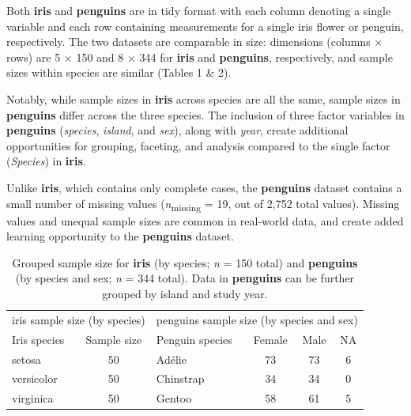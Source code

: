 Both \textbf{iris} and \textbf{penguins} are in tidy format
\citep{wickham_tidy_2014} with each column denoting a single variable
and each row containing measurements for a single iris flower or
penguin, respectively. The two datasets are comparable in size:
dimensions (columns × rows) are 5 × 150 and 8 × 344 for \textbf{iris}
and \textbf{penguins}, respectively, and sample sizes within species are
similar (Tables 1 \& 2).

Notably, while sample sizes in \textbf{iris} across species are all the
same, sample sizes in \textbf{penguins} differ across the three species.
The inclusion of three factor variables in \textbf{penguins}
(\emph{species}, \emph{island}, and \emph{sex}), along with \emph{year},
create additional opportunities for grouping, faceting, and analysis
compared to the single factor (\emph{Species}) in \textbf{iris}.

Unlike \textbf{iris}, which contains only complete cases, the
\textbf{penguins} dataset contains a small number of missing values
(\emph{n}\textsubscript{missing} = 19, out of 2,752 total values).
Missing values and unequal sample sizes are common in real-world data,
and create added learning opportunity to the \textbf{penguins} dataset.

\begin{Schunk}
\begin{table}

\caption{\label{tab:unnamed-chunk-4}Grouped sample size for \textbf{iris} (by species; \textit{n} = 150 total) and \textbf{penguins} (by species and sex; \textit{n} = 344 total). Data in \textbf{penguins} can be further grouped by island and study year.}
\centering
\begin{tabular}[t]{lclccc}
\toprule
\multicolumn{2}{c}{iris sample size (by species)} & \multicolumn{4}{c}{penguins sample size (by species and sex)} \\
\cmidrule(l{3pt}r{3pt}){1-2} \cmidrule(l{3pt}r{3pt}){3-6}
Iris species & Sample size & Penguin species & Female & Male & NA\\
\midrule
setosa & 50 & Adélie & 73 & 73 & 6\\
versicolor & 50 & Chinstrap & 34 & 34 & 0\\
virginica & 50 & Gentoo & 58 & 61 & 5\\
\bottomrule
\end{tabular}
\end{table}

\end{Schunk}

